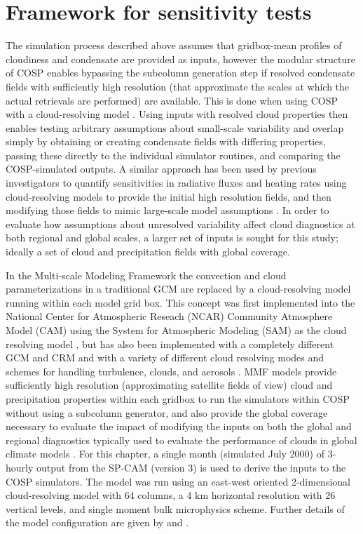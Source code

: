 \section{Framework for sensitivity tests}\label{sec:subgrid1Framework}

The simulation process described above assumes that gridbox-mean
profiles of cloudiness and condensate are provided as inputs, however
the modular structure of COSP enables bypassing the subcolumn generation
step if resolved condensate fields with sufficiently high resolution
(that approximate the scales at which the actual retrievals are
performed) are available. This is done when using COSP with a
cloud-resolving model
\citep[e.g.,][]{marchand_et_al_2009, marchand_and_ackerman_2010}. Using
inputs with resolved cloud properties then enables testing arbitrary
assumptions about small-scale variability and overlap simply by
obtaining or creating condensate fields with differing properties,
passing these directly to the individual simulator routines, and
comparing the COSP-simulated outputs. A similar approach has been used
by previous investigators to quantify sensitivities in radiative fluxes
and heating rates using cloud-resolving models to provide the initial
high resolution fields, and then modifying those fields to mimic
large-scale model assumptions
\citep[e.g.,][]{barker_et_al_1999, wu_and_liang_2005}. In order to
evaluate how assumptions about unresolved variability affect cloud
diagnostics at both regional and global scales, a larger set of inputs
is sought for this study; ideally a set of cloud and precipitation
fields with global coverage.

In the Multi-scale Modeling Framework \citep[MMF;][]{randall_et_al_2003}
the convection and cloud parameterizations in a traditional GCM are
replaced by a cloud-resolving model running within each model grid box.
This concept was first implemented into the National Center for
Atmospheric Reseach (NCAR) Community Atmosphere Model (CAM) using the
System for Atmospheric Modeling (SAM) as the cloud resolving model
\citep[SP-CAM;][]{khairoutdinov_and_randall_2001}, but has also been
implemented with a completely different GCM and CRM
\citep{tao_et_al_2009} and with a variety of different cloud resolving
modes and schemes for handling turbulence, clouds, and aerosols
\citep[e.g.,][]{cheng_and_xu_2011, cheng_and_xu_2013}. MMF models
provide sufficiently high resolution (approximating satellite fields of
view) cloud and precipitation properties within each gridbox to run the
simulators within COSP without using a subcolumn generator, and also
provide the global coverage necessary to evaluate the impact of
modifying the inputs on both the global and regional diagnostics
typically used to evaluate the performance of clouds in global climate
models \citep[e.g.,][]{gleckler_et_al_2008}. For this chapter, a single
month (simulated July 2000) of 3-hourly output from the SP-CAM (version
3) is used to derive the inputs to the COSP simulators. The model was
run using an east-west oriented 2-dimensional cloud-resolving model with
64 columns, a 4 km horizontal resolution with 26 vertical levels, and
single moment bulk microphysics scheme. Further details of the model
configuration are given by \citet{khairoutdinov_et_al_2005} and
\citet{marchand_et_al_2009}.


